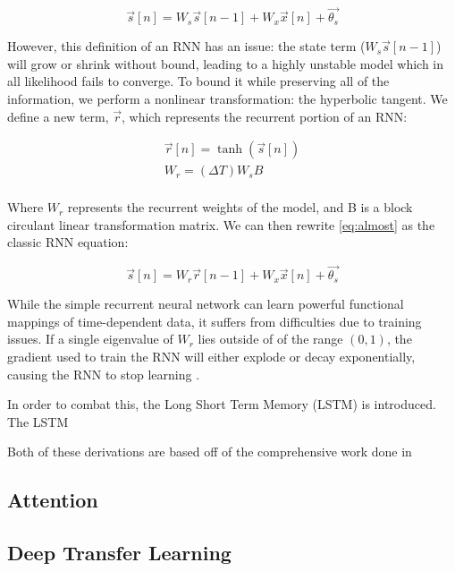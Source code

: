 \documentclass{llncs}
\begin{document}
 \begin{equation}\label{eq:almost}
	 \vec{s}\left[ n \right] = W_s \vec{s} \left[ n-1 \right] + W_x \vec{x} \left[ n \right] + \vec{\theta_s}
 \end{equation}

 However, this definition of an RNN has an issue: the state term ($W_s\vec{s}\left[ n-1 \right]$) will grow or shrink without bound, leading to a highly unstable model which in all likelihood fails to converge. To bound it while preserving all of the information, we perform a nonlinear transformation: the hyperbolic tangent. We define a new term, $\vec{r}$, which represents the recurrent portion of an RNN:

 \begin{align}
	 \vec{r}\left[ n \right] = \tanh \left(\vec{s} \left[ n \right]\right) \\
	 W_r = \left(\Delta T\right) W_s  B \\
 \end{align}

 Where $W_r$ represents the recurrent weights of the model, and B is a block circulant linear transformation matrix. We can then rewrite \autoref{eq:almost} as the classic RNN equation:

 \begin{equation}\label{eq:rnn}
	 \vec{s}\left[ n \right] = W_r \vec{r} \left[ n-1 \right] + W_x \vec{x} \left[ n \right] + \vec{\theta_s}
 \end{equation}

 While the simple recurrent neural network can learn powerful functional mappings of time-dependent data, it suffers from difficulties due to training issues. If a single eigenvalue of $W_r$ lies outside of of the range $\left(0, 1\right)$, the gradient used to train the RNN will either explode or decay exponentially, causing the RNN to stop learning \cite{rnn_fun}.

In order to combat this, the Long Short Term Memory (LSTM) is introduced. The LSTM 

 Both of these derivations are based off of the comprehensive work done in \cite{rnn_fun}

 \subsection{Attention}



 \subsection{Deep Transfer Learning}
\end{document}

